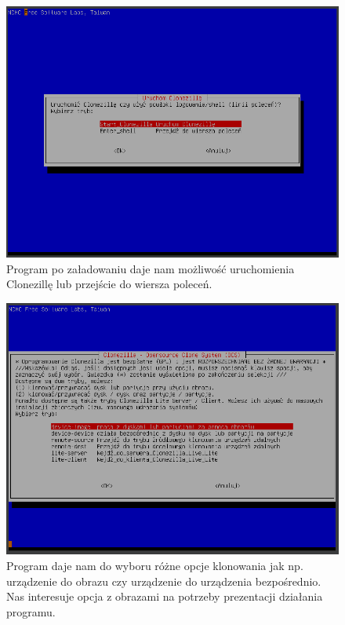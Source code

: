 \documentclass[0.82pt,a4paper]{article}
\begin{document}
    \begin{figure}[H]
        \centering
        \includegraphics[width=0.8\linewidth]{media/Clonezilla/clone3.PNG}
        \caption[clone start]{Program po załadowaniu daje nam możliwość uruchomienia Clonezillę lub przejście do wiersza poleceń.}
        \label{fig:clone3}
    \end{figure}
    
    \begin{figure}[H]
        \centering
        \includegraphics[width=0.8\linewidth]{media/Clonezilla/clone4.PNG}
        \caption[clone wybor opcji]{Program daje nam do wyboru różne opcje klonowania jak np. urządzenie do obrazu czy urządzenie do urządzenia bezpośrednio. Nas interesuje opcja z obrazami na potrzeby prezentacji działania programu.}
        \label{fig:clone4}
    \end{figure}
    
\end{document}
